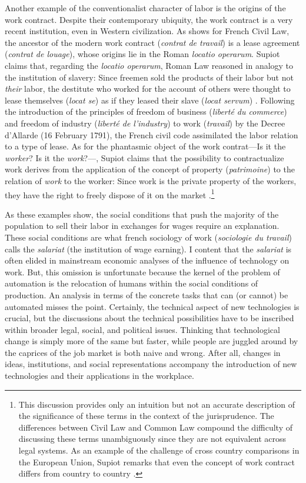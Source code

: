 \documentclass[version=last,draft=false,paper=A4,portrait,twoside=true,twocolumn=false,headinclude=false,footinclude=false,mpinclude=true,fontsize=12,BCOR=20mm,DIV=calc,pagesize=auto,open=right,chapterprefix=true,numbers=autoendperiod,headsepline=false,headings=twolinechapter,parskip=false]{scrbook}
\begin{document}
Another example of the conventionalist character of labor is the origins of
the work contract. Despite their contemporary ubiquity, the work contract
is a very recent institution, even in Western civilization. As
\textcite{supiot2004_2016} shows for French Civil Law, the ancestor of the
modern work contract (\emph{contrat de travail}) is a lease agreement (\emph{contrat de
louage}), whose origins lie in the Roman \emph{locatio operarum}. Supiot claims
that, regarding the \emph{locatio operarum}, Roman Law reasoned in analogy to the
institution of slavery: Since freemen sold the products of their labor but
not \emph{their} labor, the destitute who worked for the account of others were
thought to lease themselves (\emph{locat se}) as if they leased their slave (\emph{locat
servum}) \autocite[8]{supiot2004_2016}. Following the introduction of
the principles of freedom of business (\emph{liberté du commerce}) and freedom of
industry (\emph{liberté de l'industry}) to work (\emph{travail}) by the Decree d'Allarde
(16 February 1791), the French civil code assimilated the labor relation to
a type of lease. As for the phantasmic object of the work contrat---Is it
the \emph{worker}? Is it the \emph{work}?---, Supiot claims that the possibility to
contractualize work derives from the application of the concept of property
(\emph{patrimoine}) to the relation of \emph{work} to the worker: Since work is the
private property of the workers, they have the right to freely dispose of
it on the market \autocite[45--66]{supiot1994_2011}.\footnote{This discussion provides only an intuition but not an accurate
description of the significance of these terms in the context of the
jurisprudence. The differences between Civil Law and Common Law compound
the difficulty of discussing these terms unambiguously since they are not
equivalent across legal systems. As an example of the challenge of cross
country comparisons in the European Union, Supiot remarks that even the
concept of work contract differs from country to country
\autocite{supiot_et_al1999_2016}.}

As these examples show, the social conditions that push the majority of the
population to sell their labor in exchanges for wages require an
explanation. These social conditions are what french sociology of work
(\emph{sociologie du travail}) calls the \emph{salariat} (the institution of wage
earning). I content that the \emph{salariat} is often elided in mainstream
economic analyses of the influence of technology on work. But, this
omission is unfortunate because the kernel of the problem of automation is
the relocation of humans within the social conditions of production. An
analysis in terms of the concrete tasks that can (or cannot) be automated
misses the point. Certainly, the technical aspect of new technologies is
crucial, but the discussions about the technical possibilities have to be
inscribed within broader legal, social, and political issues. Thinking that
technological change is simply more of the same but faster, while people
are juggled around by the caprices of the job market is both naive and
wrong. After all, changes in ideas, institutions, and social
representations accompany the introduction of new technologies and their
applications in the workplace.
\end{document}
